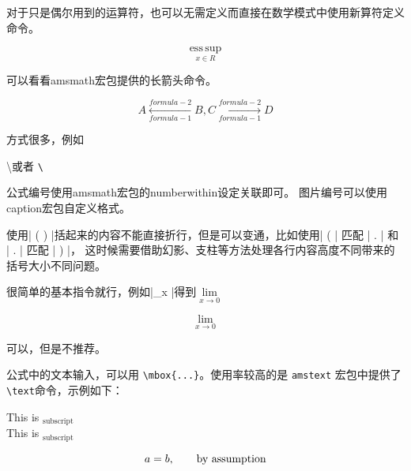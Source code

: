 对于只是偶尔用到的运算符，也可以无需定义而直接在数学模式中使用新算符定义命令。
%

\begin{example}
\[
  \operatorname*{ess\,sup}_{x\in {R}}
\]
\end{example}


可以看看amsmath宏包提供的长箭头命令。
\begin{example}
\[
  A \xleftarrow[formula-1]{formula-2} B,
  C \xrightarrow[formula-1]{formula-2} D
\]

\end{example}

方式很多，例如
\begin{example}
  \textbackslash \quad 或者 \quad \verb|\|
\end{example}
%



公式编号使用amsmath宏包的numberwithin设定关联即可。
图片编号可以使用caption宏包自定义格式。

使用| \left( \right) |括起来的内容不能直接折行，但是可以变通，比如使用| \left( | 匹配 | \right. | 和 | \left. | 匹配 | \right) |，
这时候需要借助幻影、支柱等方法处理各行内容高度不同带来的括号大小不同问题。

很简单的基本指令就行，例如|\lim\limits_{x }|得到$\lim\limits_{x \to 0}$
\begin{example}
\[
  \lim\limits_{x \to 0}
\]
\end{example}

可以，但是不推荐。

公式中的文本输入，可以用 \verb|\mbox{...}|。使用率较高的是 \texttt{amstext} 宏包中提供了\verb|\text|命令，示例如下：
\begin{example}
\begin{center}
  This is $_{\text{subscript}}$\\
  This is $_{\mbox{subscript}}$
\end{center}
\[a = b, \text{\qquad by assumption}\]
\end{example}

